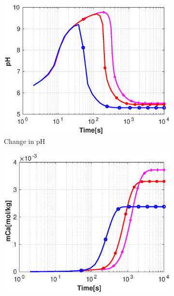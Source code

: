 \begin{figure}[!h]
        \centering
    \begin{subfigure}{.5\linewidth}
        \centering
        \includegraphics[width=\textwidth]{PICTURES/with_vel_pH.eps}
        \caption{Change in pH}
        \label{fig:velpH}       %
    \end{subfigure}%
        \hfill
    \begin{subfigure}{.5\linewidth}
        \centering
        \includegraphics[width=\textwidth]{PICTURES/with_vel_mCa.eps}

\end{subfigure}
\end{figure}
